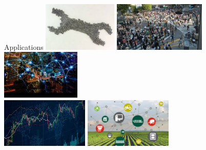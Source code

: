 \documentclass[presentation, 9pt]{beamer}\mode<presentation>{\usetheme{AMSBolognaFC}}
\begin{document}
\begin{frame}{Applications}
\centering
\includegraphics[height=2.35cm]{img/swarm.jpeg}
\includegraphics[height=2.35cm]{img/crowd-intersection.jpg}
\includegraphics[height=2.35cm]{img/smart-city.jpeg}
\centering
\\
\vspace{0.12cm}
\includegraphics[height=2.35cm]{img/finance.jpeg}
\includegraphics[height=2.35cm]{img/smart-agriculture.jpeg}
\end{frame}
\end{document}
